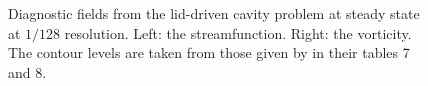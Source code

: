 \begin{figure}
\centering
{}
\caption{Diagnostic fields from the lid-driven cavity problem at steady state at $1/128$ resolution.
Left: the streamfunction. Right: the vorticity. The contour levels are taken from those given by \cite{botella1998} in their tables
7 and 8.}
\label{fig:driven_cavity1}
\end{figure}


